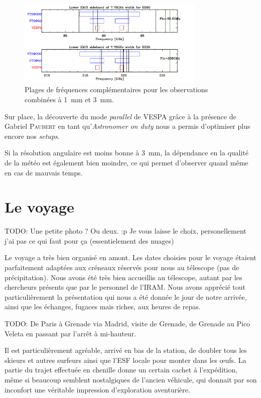 \documentclass[a4paper,10pt,french]{article}
\newcommand{\troismm}{\SI{3}{\milli\meter}}
\newcommand{\unmm}{\SI{1}{\milli\meter}}
\begin{document}
\begin{figure}[ht]
    \centering
    \includegraphics[width=0.8\textwidth]{figures/specsetup-3mm-1mm-l.pdf}
    \caption{Plages de fréquences complémentaires pour les observations combinées à \unmm{} et \troismm.}
    \label{fig:specsetup_3mm_1mm_l}
\end{figure}

Sur place, la découverte du mode \textit{parallel} de VESPA grâce à la présence
de Gabriel \textsc{Paubert} en tant qu’\textit{Astronomer on duty} nous a
permis d’optimiser plus encore nos \textit{setups}.

Si la résolution angulaire est moins bonne à \troismm, la dépendance en la
qualité de la météo est également bien moindre, ce qui permet d’observer quand
même en cas de mauvais temps.

\section{Le voyage}

TODO: Une petite photo ? Ou deux. :p Je vous laisse le choix, personellement j'ai pas ce qui faut pour ça (essentielement des nuages)

Le voyage a très bien organisé en amont. Les dates choisies pour le voyage
étaient parfaitement adaptées aux créneaux réservés pour nous au télescope (pas
de précipitation). Nous avons été très bien accueillis au télescope, autant par
les chercheurs présents que par le personnel de l’IRAM. Nous avons apprécié
tout particulièrement la présentation qui nous a été donnée le jour de notre
arrivée, ainsi que les échanges, fugaces mais riches, aux heures de repas.

TODO: De Paris à Grenade via Madrid, visite de Grenade, de Grenade au Pico
Veleta en passant par l’arrêt à mi-hauteur.

Il est particulièrement agréable, arrivé en bas de la station, de doubler tous
les skieurs et autres surfeurs ainsi que l’ESF locale pour monter dans les
œufs. La partie du trajet effectuée en chenille donne un certain cachet à
l’expédition, même si beaucoup semblent nostalgiques de l’ancien véhicule, qui
donnait par son inconfort une véritable impression d’exploration aventurière.
\end{document}
